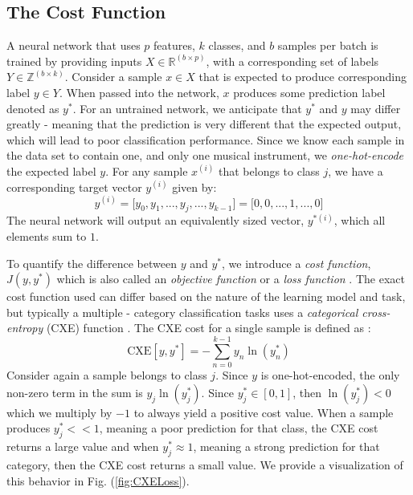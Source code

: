 \documentclass[conference,onecolumn,letterpaper]{IEEEtran}
\begin{document}

\subsection{The Cost Function}
\label{subsec:CostFunction}

A neural network that uses $p$ features, $k$ classes, and $b$ samples per batch is trained by providing inputs $X \in \mathbb{R}^{(b \times p)}$, with a corresponding set of labels $Y \in \mathbb{Z}^{(b \times k)}$. Consider a sample $x \in X$ that is expected to produce corresponding label $y \in Y$. When passed into the network, $x$ produces some prediction label denoted as $y^*$. For an untrained network, we anticipate that $y^*$ and $y$ may differ greatly - meaning that the prediction is very different that the expected output, which will lead to poor classification performance. Since we know each sample in the data set to contain one, and only one musical instrument, we \textit{one-hot-encode} the expected label $y$. For any sample $x^{(i)}$ that belongs to class $j$, we have a corresponding target vector $y^{(i)}$ given by:
\begin{equation}
    \label{eqn:OneHotEnc}
    y^{(i)} = \big[ y_{0} , y_{1}, ... , y_{j}, ... , y_{k-1} \big] = \big[ 0, 0, ... , 1, ... , 0 \big]
\end{equation}
The neural network will output an equivalently sized vector, $y^{*(i)}$, which all elements sum to $1$.

To quantify the difference between $y$ and $y^*$, we introduce a \textit{cost function}, $J(y,y^*)$ which is also called an \textit{objective function} or a \textit{loss function} \cite{James}. The exact cost function used can differ based on the nature of the learning model and task, but typically a multiple - category classification tasks uses a \textit{categorical cross-entropy} (CXE) function \cite{Geron,Goodfellow}. The CXE cost for a single sample is defined as \cite{Goodfellow,Virtanen}:
\begin{equation}
    \label{eqn:CXELoss}
    \text{CXE}[y,y^*] = - \sum_{n=0}^{k-1} y_{n} \ln(y^*_{n})
\end{equation}
Consider again a sample belongs to class $j$. Since $y$ is one-hot-encoded, the only non-zero term in the sum is $y_{j} \ln(y^*_{j})$. Since $y^*_{j} \in [0,1]$, then $\ln(y^*_{j}) < 0$ which we multiply by $-1$ to always yield a positive cost value. When a sample produces $y^*_{j} << 1$, meaning a poor prediction for that class, the CXE cost returns a large value and when $y^*_{j} \approx 1$, meaning a strong prediction for that category, then the CXE cost returns a small value. We provide a visualization of this behavior in Fig. (\ref{fig:CXELoss}).
\end{document}
